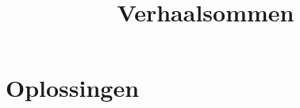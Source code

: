 \documentclass[12pt,a4paper]{article}
\title{Verhaalsommen}
\author{}  %
\date{}    %
\newif\ifshowopgave
\newif\ifshowoplossing
\begin{document}
\maketitle

\showopgavetrue
\showoplossingfalse


\clearpage
\appendix

\section*{Oplossingen}
\showopgavefalse
\showoplossingtrue

\end{document}
